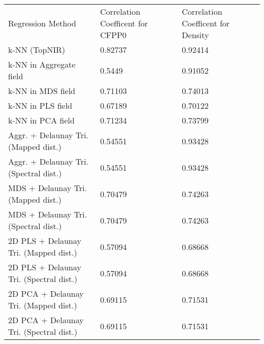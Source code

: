 \begin{table}[!hb]
	\centering
	\begin{tabular}{lll}
		Regression Method			& Correlation Coefficent for CFPP0	& Correlation Coefficent for Density\\
		k-NN (TopNIR)				& 0.82737				& 0.92414\\
		k-NN in Aggregate field			& 0.5449				& 0.91052\\
		k-NN in MDS field			& 0.71103				& 0.74013\\
		k-NN in PLS field			& 0.67189				& 0.70122\\
		k-NN in PCA field			& 0.71234				& 0.73799\\
		Aggr. + Delaunay Tri. (Mapped dist.)	& 0.54551				& 0.93428\\
		Aggr. + Delaunay Tri. (Spectral dist.)	& 0.54551				& 0.93428\\
		MDS + Delaunay Tri. (Mapped dist.)	& 0.70479				& 0.74263\\
		MDS + Delaunay Tri. (Spectral dist.)	& 0.70479				& 0.74263\\
		2D PLS + Delaunay Tri. (Mapped dist.)	& 0.57094				& 0.68668\\
		2D PLS + Delaunay Tri. (Spectral dist.)	& 0.57094				& 0.68668\\
		2D PCA + Delaunay Tri. (Mapped dist.)	& 0.69115				& 0.71531\\
		2D PCA + Delaunay Tri. (Spectral dist.)	& 0.69115				& 0.71531\\
	\end{tabular}
\end{table}
